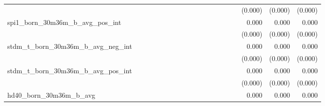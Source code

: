 \begin{tabular}{lrrrrrrrrrrrrrrrrrr}
                                            &              &              &              &              &              &              &              &              &               &              &              &               &              &              &               &      (0.000) &      (0.000) &       (0.000) \\ 
spi1\_born\_30m36m\_b\_avg\_pos\_int        &              &              &              &              &              &              &              &              &               &              &              &               &              &              &               &        0.000 &        0.000 &         0.000 \\ 
                                            &              &              &              &              &              &              &              &              &               &              &              &               &              &              &               &      (0.000) &      (0.000) &       (0.000) \\ 
stdm\_t\_born\_30m36m\_b\_avg\_neg\_int     &              &              &              &              &              &              &              &              &               &              &              &               &              &              &               &        0.000 &        0.000 &         0.000 \\ 
                                            &              &              &              &              &              &              &              &              &               &              &              &               &              &              &               &      (0.000) &      (0.000) &       (0.000) \\ 
stdm\_t\_born\_30m36m\_b\_avg\_pos\_int     &              &              &              &              &              &              &              &              &               &              &              &               &              &              &               &        0.000 &        0.000 &         0.000 \\ 
                                            &              &              &              &              &              &              &              &              &               &              &              &               &              &              &               &      (0.000) &      (0.000) &       (0.000) \\ 
hd40\_born\_30m36m\_b\_avg                  &              &              &              &              &              &              &              &              &               &              &              &               &              &              &               &        0.000 &        0.000 &         0.000 \\ 

\end{tabular}
